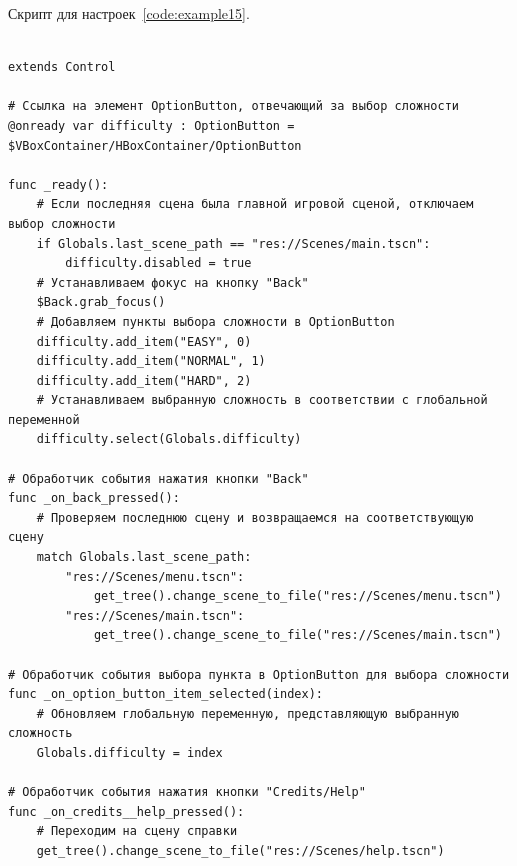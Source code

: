 \label{{subsec:ch02/sec01/sub16}Подраздел 16. Скрипт для настроек}
Скрипт для настроек~\ref{code:example15}.
\begin{code}
\vspace{-\baselineskip}\begin{verbatim}

extends Control

# Ссылка на элемент OptionButton, отвечающий за выбор сложности
@onready var difficulty : OptionButton = $VBoxContainer/HBoxContainer/OptionButton

func _ready():
    # Если последняя сцена была главной игровой сценой, отключаем выбор сложности
    if Globals.last_scene_path == "res://Scenes/main.tscn":
        difficulty.disabled = true
    # Устанавливаем фокус на кнопку "Back"
    $Back.grab_focus()
    # Добавляем пункты выбора сложности в OptionButton
    difficulty.add_item("EASY", 0)
    difficulty.add_item("NORMAL", 1)
    difficulty.add_item("HARD", 2)
    # Устанавливаем выбранную сложность в соответствии с глобальной переменной
    difficulty.select(Globals.difficulty)

# Обработчик события нажатия кнопки "Back"
func _on_back_pressed():
    # Проверяем последнюю сцену и возвращаемся на соответствующую сцену
    match Globals.last_scene_path:
        "res://Scenes/menu.tscn":
            get_tree().change_scene_to_file("res://Scenes/menu.tscn")
        "res://Scenes/main.tscn":
            get_tree().change_scene_to_file("res://Scenes/main.tscn")

# Обработчик события выбора пункта в OptionButton для выбора сложности
func _on_option_button_item_selected(index):
    # Обновляем глобальную переменную, представляющую выбранную сложность
    Globals.difficulty = index

# Обработчик события нажатия кнопки "Credits/Help"
func _on_credits__help_pressed():
    # Переходим на сцену справки
    get_tree().change_scene_to_file("res://Scenes/help.tscn")

\end{verbatim}
\end{code}

